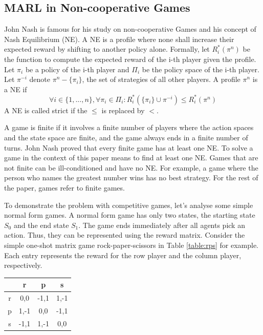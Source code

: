 \documentclass[a4paper]{article}
\begin{document}
\begin{multicols}{2}
\section{MARL in Non-cooperative Games}
John Nash is famous for his study on non-cooperative Games and his concept of Nash Equilibrium (NE). A NE is a profile where none shall increase their expected reward by shifting to another policy alone. Formally, let $R_i^*(\pi^n)$ be the function to compute the expected reward of the i-th player given the profile. Let $\pi_i$ be a policy of the i-th player and $\Pi_i$ be the policy space of the i-th player. Let $\pi^{-i}$ denote $\pi^n - \{\pi_i\}$, the set of strategies of all other players. A profile $\pi^n$ is a NE if
\begin{equation}
\forall i \in \{1, ..., n\}, \forall \pi_i \in \Pi_i: R_i^*(\{\pi_i\} \cup \pi^{-i}) \leqslant R_i^*(\pi^n)
\label{eq:nash}
\end{equation}
A NE is called strict if the $\leqslant$ is replaced by $<$.

A game is finite if it involves a finite number of players where
the action spaces and the state space are finite, and the game always ends in a finite number of turns. John Nash proved that every finite game has at least one NE. To solve a game in the context of this paper means to find at least one NE. Games that are not finite can be ill-conditioned and have no NE. For example, a game where the person who names the greatest number wins has no best strategy. For the rest of the paper, games refer to finite games.

To demonstrate the problem with competitive games, let's analyse some simple normal form games. A normal form game has only two states, the starting state $S_0$ and the end state $S_1$. The game ends immediately after all agents pick an action. Thus, they can be represented using the reward matrix. Consider the simple one-shot matrix game rock-paper-scissors in Table \ref{table:rps} for example. Each entry represents the reward for the row player and the column player, respectively.

\noindent
\begin{minipage}{\columnwidth}
\label{table:rps}
\centering
\begin{tabular}{c|ccc}
    & r & p & s\\
    \hline
    r & 0,0 & -1,1 & 1,-1 \\
    p & 1,-1 & 0,0 & -1,1 \\
    s & -1,1 & 1,-1 & 0,0 \\
\end{tabular}
\end{minipage}


\end{multicols}
\end{document}
